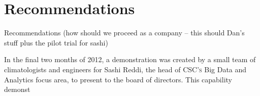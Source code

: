 \chapter{Recommendations}
Recommendations (how should we proceed as a company -- this should Dan's stuff plus the pilot trial for sashi)

In the final two months of 2012, a demonstration was created by a small team of climatologists and engineers for Sashi Reddi, the head of \textsc{CSC's} Big Data and Analytics focus area, to present to the board of directors. This capability demonst




\renewcommand\bibname{{References}}

